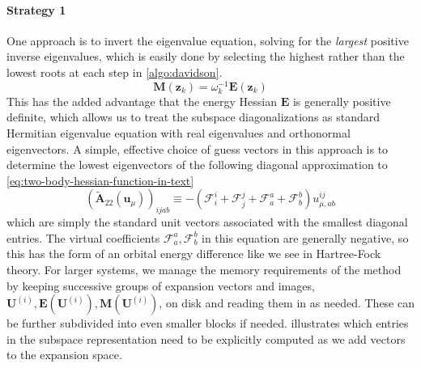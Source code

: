 \paragraph{Strategy 1}
One approach is to invert the eigenvalue equation, solving for the {\itshape
largest} positive inverse eigenvalues, which is easily done by selecting the
highest rather than the lowest roots at each step in \cref{algo:davidson}.
\begin{equation}
    \mathbf{M}(\mathbf{z}_k)
    =
    \omega_k^{-1}
    \mathbf{E}(\mathbf{z}_k)
\end{equation}
This has the added advantage that the energy Hessian \(\mathbf{E}\) is generally
positive definite, which allows us to treat the subspace diagonalizations as
standard Hermitian eigenvalue equation with real eigenvalues and orthonormal
eigenvectors.
A simple, effective choice of guess vectors in this approach is to determine the
lowest eigenvectors of the following diagonal approximation to
\cref{eq:two-body-hessian-function-in-text}
\begin{equation}
    (\tilde{\mathbf{A}}_{22}(\mathbf{u}_{\mu}))_{ijab}
    \equiv
    -
    (
        \mathcal{F}_i^i
        +
        \mathcal{F}_j^j
        +
        \mathcal{F}_a^a
        +
        \mathcal{F}_b^b
    )
    u_{\mu,ab}^{ij}
\end{equation}
which are simply the standard unit vectors associated with the smallest diagonal
entries.
The virtual coefficients \(\mathcal{F}_a^a,\mathcal{F}_b^b\) in this equation
are generally negative, so this has the form of an orbital energy difference
like we see in Hartree-Fock theory.
For larger systems, we manage the memory requirements of the method by keeping
successive groups of expansion vectors and images,
\(
    \mathbf{U}^{(i)},
    \mathbf{E}(\mathbf{U}^{(i)}),
    \mathbf{M}(\mathbf{U}^{(i)})
\),
on disk and reading them in as needed.
These can be further subdivided into even smaller blocks if needed.
 illustrates which entries in the subspace representation
need to be explicitly computed as we add vectors to the expansion space.


